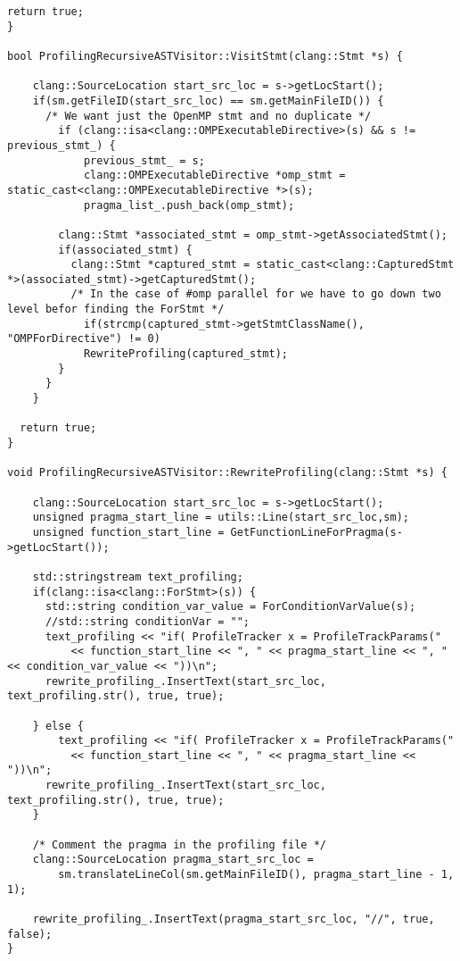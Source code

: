 \documentclass[a4paper,10pt,twoside]{book}
\begin{document}
\begin{lstlisting}[language=CCC, caption=driver/program.cpp]
  return true; 
}

bool ProfilingRecursiveASTVisitor::VisitStmt(clang::Stmt *s) {

	clang::SourceLocation start_src_loc = s->getLocStart();
	if(sm.getFileID(start_src_loc) == sm.getMainFileID()) {
      /* We want just the OpenMP stmt and no duplicate */
  		if (clang::isa<clang::OMPExecutableDirective>(s) && s != previous_stmt_) {
  			previous_stmt_ = s;
  			clang::OMPExecutableDirective *omp_stmt = static_cast<clang::OMPExecutableDirective *>(s);
  			pragma_list_.push_back(omp_stmt);
  			
        clang::Stmt *associated_stmt = omp_stmt->getAssociatedStmt();
        if(associated_stmt) {
          clang::Stmt *captured_stmt = static_cast<clang::CapturedStmt *>(associated_stmt)->getCapturedStmt();
          /* In the case of #omp parallel for we have to go down two level befor finding the ForStmt */
  		    if(strcmp(captured_stmt->getStmtClassName(), "OMPForDirective") != 0)
            RewriteProfiling(captured_stmt);
        }
      }
  	}
  	
  return true;
}

void ProfilingRecursiveASTVisitor::RewriteProfiling(clang::Stmt *s) {
  	
  	clang::SourceLocation start_src_loc = s->getLocStart();
  	unsigned pragma_start_line = utils::Line(start_src_loc,sm);
  	unsigned function_start_line = GetFunctionLineForPragma(s->getLocStart());

    std::stringstream text_profiling;
    if(clang::isa<clang::ForStmt>(s)) {
      std::string condition_var_value = ForConditionVarValue(s);
      //std::string conditionVar = "";
      text_profiling << "if( ProfileTracker x = ProfileTrackParams(" 
          << function_start_line << ", " << pragma_start_line << ", " << condition_var_value << "))\n";
      rewrite_profiling_.InsertText(start_src_loc, text_profiling.str(), true, true);

    } else {
	    text_profiling << "if( ProfileTracker x = ProfileTrackParams(" 
          << function_start_line << ", " << pragma_start_line << "))\n";
      rewrite_profiling_.InsertText(start_src_loc, text_profiling.str(), true, true);
    }

    /* Comment the pragma in the profiling file */
    clang::SourceLocation pragma_start_src_loc = 
        sm.translateLineCol(sm.getMainFileID(), pragma_start_line - 1, 1);
    
    rewrite_profiling_.InsertText(pragma_start_src_loc, "//", true, false);
}


\end{lstlisting}
\end{document}
